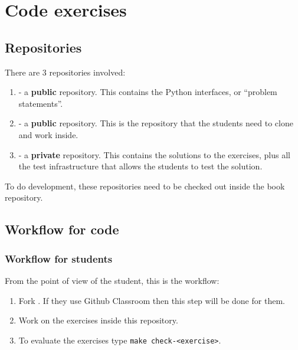 
\section{\usebox{\chaptergear}
  Code exercises}

\subsection{Repositories}
There are 3 repositories involved:
\begin{enumerate}
    \item {} - a \textbf{public} repository.
          This contains the Python interfaces, or ``problem statements''.
    \item {} - a \textbf{public} repository.
          This is the repository that the students need to clone and work inside.
    \item {} - a \textbf{private} repository.
          This contains the solutions to the exercises, plus all the test infrastructure that allows the students to test the solution.
\end{enumerate}

To do development, these repositories need to be checked out inside the book repository.

\subsection{Workflow for code}

\subsubsection{Workflow for students}

From the point of view of the student, this is the workflow:

\begin{enumerate}
    \item Fork .
          If they use Github Classroom then this step will be done for them.
    \item Work on the exercises inside this repository.
    \item To evaluate the exercises type \texttt{make check-<exercise>}.
\end{enumerate}

